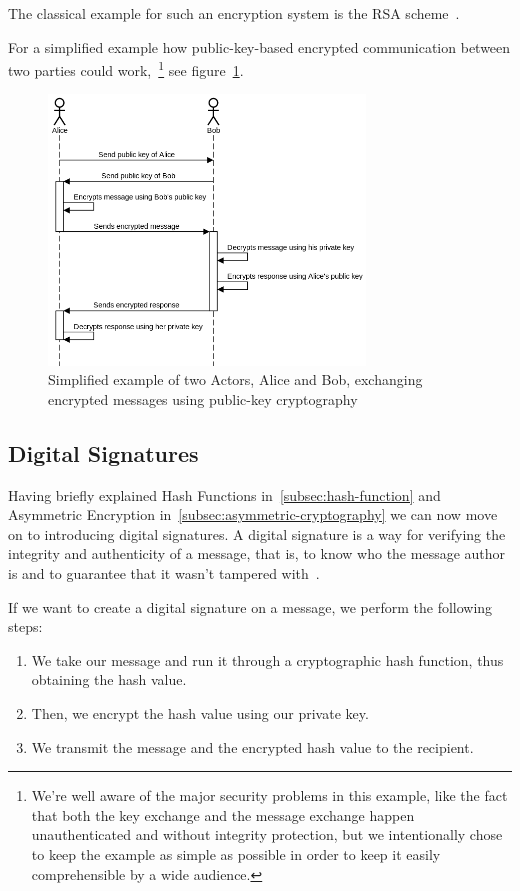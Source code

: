 The classical example for such an encryption system is the \gls{RSA} scheme~\cite{rsa}.

For a simplified example how public-key-based encrypted communication between two parties could work,~\footnote{
We're well aware of the major security problems in this example,
like the fact that both the key exchange and the message exchange happen unauthenticated and without integrity protection,
but we intentionally chose to keep the example as simple as possible in order to keep it easily comprehensible by a wide audience.
}
see figure~\ref{fig:simplepubkeycomm}.

\begin{figure}
    \centering
    \includegraphics[width=0.75\textwidth]{images/simplistic_pubkey_communication.png}
    \caption{Simplified example of two Actors, Alice and Bob, exchanging encrypted messages using public-key cryptography}
    \label{fig:simplepubkeycomm}
\end{figure}


\subsection{Digital Signatures}\label{subsec:digital-signatures}
Having briefly explained Hash Functions in~\ref{subsec:hash-function} and Asymmetric Encryption in~\ref{subsec:asymmetric-cryptography} we can now move on to introducing digital signatures.
A digital signature is a way for verifying the integrity and authenticity of a message, that is,
to know who the message author is and to guarantee that it wasn't tampered with~\cite{digitalsignature}.

If we want to create a digital signature on a message, we perform the following steps:
\begin{enumerate}\label{enum:digitalsignaturecreation}
    \item We take our message and run it through a cryptographic hash function, thus obtaining the hash value.
    \item Then, we encrypt the hash value using our private key.
    \item We transmit the message and the encrypted hash value to the recipient.
\end{enumerate}


